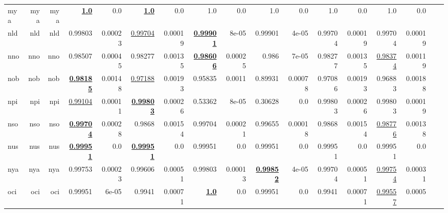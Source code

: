 \documentclass[11pt]{article}
\begin{document}
\begin{table*}[h]
{\begin{tabular}{lrrrrrrrrrrrrrrrr}
mya         & mya         & mya         & \textbf{\underline{1.0}}         & 0.0         & \textbf{\underline{1.0}}         & 0.0         & 1.0         & 0.0         & 1.0         & 0.0         & 1.0         & 0.0         & 1.0         & 0.0         \\
nld         & nld         & nld         & 0.99803         & 0.00023         & \underline{0.99704}         & 0.00019         & \textbf{\underline{0.99901}}         & 8e-05         & 0.99901         & 4e-05         & 0.99704         & 0.00019         & 0.99704         & 0.00019         \\
nno         & nno         & nno         & 0.98507         & 0.00045         & 0.98277         & 0.00135         & \textbf{\underline{0.98606}}         & 0.00025         & 0.986         & 7e-05         & 0.98277         & 0.00135         & \underline{0.98374}         & 0.00119         \\
nob         & nob         & nob         & \textbf{\underline{0.98185}}         & 0.00148         & \underline{0.97188}         & 0.00193         & 0.95835         & 0.0011         & 0.89931         & 0.00078         & 0.97086         & 0.00193         & 0.96883         & 0.00188         \\
npi         & npi         & npi         & \underline{0.99104}         & 0.00011         & \textbf{\underline{0.99803}}         & 0.00026         & 0.53362         & 8e-05         & 0.30628         & 0.0         & 0.99803         & 0.00026         & 0.99803         & 0.00019         \\
nso         & nso         & nso         & \textbf{\underline{0.99704}}         & 0.00028         & 0.9868         & 0.00154         & 0.99704         & 0.00021         & 0.99655         & 0.00018         & 0.9868         & 0.00154         & \underline{0.98776}         & 0.00138         \\
nus         & nus         & nus         & \textbf{\underline{0.99951}}         & 0.0         & \textbf{\underline{0.99951}}         & 0.0         & 0.99951         & 0.0         & 0.99951         & 0.0         & 0.99951         & 0.0         & 0.99951         & 0.0         \\
nya         & nya         & nya         & 0.99753         & 0.00023         & 0.99606         & 0.00051         & 0.99803         & 0.00013         & \textbf{\underline{0.99852}}         & 4e-05         & 0.99704         & 0.00051         & \underline{0.99754}         & 0.00031         \\
oci         & oci         & oci         & 0.99951         & 6e-05         & 0.9941         & 0.00071         & \textbf{\underline{1.0}}         & 0.0         & 0.99951         & 0.0         & 0.9941         & 0.00071         & \underline{0.99557}         & 0.0005         \\

\end{tabular}}
\end{table*}
\end{document}
